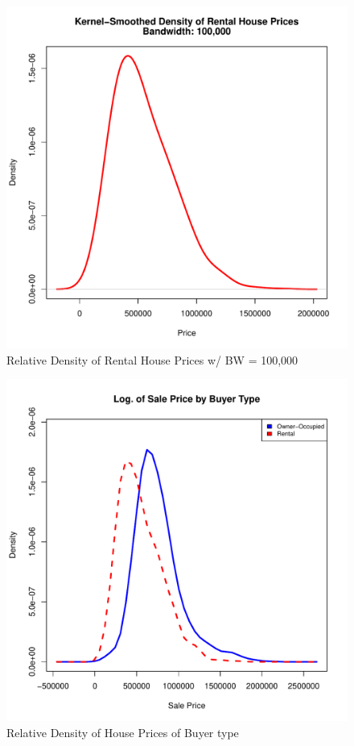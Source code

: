 %
%
\begin{figure}[h!]
  \centering
  \includegraphics[scale = 0.5, keepaspectratio=true]{../Figures/density_Price_Rental}
  \caption{Relative Density of Rental House Prices w/ BW = 100,000} \label{fig:density_Price_Rental}
\end{figure}
%
%
\begin{figure}[h!]
  \centering
  \includegraphics[scale = 0.5, keepaspectratio=true]{../Figures/dens_by_owner}
  \caption{Relative Density of House Prices of Buyer type} \label{fig:dens_by_owner}
\end{figure}
